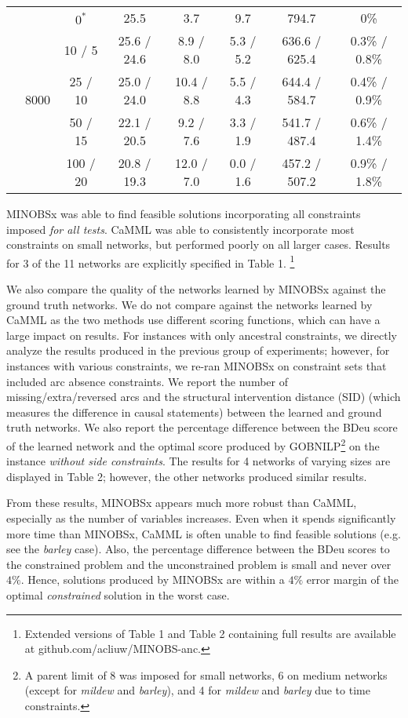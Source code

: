 \documentclass[twoside,11pt]{article}
\begin{document}
\begin{table}[ht]
\begin{tabular}{ c | c | c || c | c | c | c | c  }
\hhline{~|-|-||-|-|-|-|-} 
& \multirow{5}{*}{8000}
& $0^*$ & 25.5 & 3.7 & 9.7 & 794.7 & 0\% \\
& & 10 / 5 & 25.6 / 24.6 & 8.9 / 8.0 & 5.3 / 5.2 & 636.6 / 625.4 & 0.3\% / 0.8\% \\
& & 25 / 10 & 25.0 / 24.0 & 10.4 / 8.8 & 5.5 / 4.3 & 644.4 / 584.7 & 0.4\% / 0.9\% \\
& & 50 / 15 & 22.1 / 20.5 & 9.2 / 7.6 & 3.3 / 1.9 & 541.7 / 487.4 & 0.6\% / 1.4\% \\
& & 100 / 20 & 20.8 / 19.3 & 12.0 / 7.0 & 0.0 / 1.6 & 457.2 / 507.2 & 0.9\% / 1.8\% \\

\end{tabular}
\end{table}

MINOBSx was able to find feasible solutions incorporating all constraints imposed \emph{for all tests}. CaMML was able to consistently incorporate most constraints on small networks,
but performed poorly on all larger cases. Results for 3 of the 11 networks are explicitly specified in Table 1. \footnote{Extended versions of Table 1 and Table 2 containing full results are available at github.com/acliuw/MINOBS-anc.}

\smallskip
We also compare the quality of the networks learned by MINOBSx against the ground truth networks. We do not compare against the 
networks learned by CaMML as the two methods use different scoring functions, which can have a large impact on results. For instances with only ancestral constraints,
we directly analyze the results produced in the previous group of experiments; however, for instances with various constraints, we re-ran MINOBSx on constraint sets
that included arc absence constraints. 
We report the number of missing/extra/reversed arcs and the structural
intervention distance (SID) \citep{Peters2015} (which measures the difference in causal statements) between the learned and ground truth networks. We also report the percentage
difference between the BDeu score of the learned network and the optimal score produced by GOBNILP\footnote{A parent limit of 8 was imposed for small networks, 6 on medium networks (except for \emph{mildew} and \emph{barley}), and 4 for
\emph{mildew} and \emph{barley} due to time constraints.} on the instance \emph{without side constraints}. The results for 4 networks of varying sizes are displayed in Table 2; however, the other networks produced similar results. 

\smallskip
From these results, MINOBSx appears much more robust than CaMML, especially as the number of variables increases. Even when it spends significantly more time than
MINOBSx, CaMML is often unable to find feasible solutions (e.g. see the \emph{barley} case). Also, the percentage difference between
the BDeu scores to the constrained problem and the unconstrained problem is small and never over $4\%$.
Hence, solutions produced by MINOBSx are within a $4\%$ error margin of the optimal \emph{constrained} solution in the worst case. 
\end{document}
